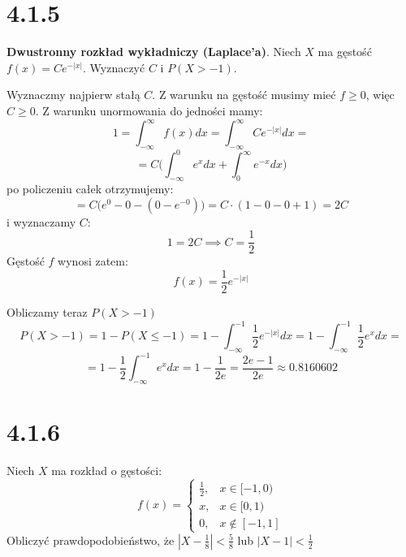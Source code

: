 \documentclass{article}
\begin{document}
\section*{4.1.5}
\begin{center}
    \textbf{Dwustronny rozkład wykładniczy (Laplace'a)}. Niech \(X\) ma gęstość \(f(x) = Ce^{-|x|}\).
    Wyznaczyć \(C\) i \(P(X > -1)\).
\end{center}
Wyznaczmy najpierw stałą \(C\). Z warunku na gęstość musimy mieć \(f \geq 0\), więc \(C \geq 0\). Z warunku unormowania do jedności mamy:
\begin{equation*}
    1 = \int_{-\infty}^{\infty} f(x)dx = \int_{-\infty}^{\infty} Ce^{-|x|} dx = 
\end{equation*}
\begin{equation*}
    = C \Big(\int_{-\infty}^{0} e^{x} dx + \int_{0}^{\infty} e^{-x} dx\Big)
\end{equation*}
po policzeniu całek otrzymujemy:
\begin{equation*}
    = C \Big(e^0 - 0 - (0 - e^{-0})\Big) = C \cdot (1 - 0 - 0 + 1) = 2C
\end{equation*}
i wyznaczamy \(C\):
\begin{equation*}
    1 = 2C \implies C = \frac{1}{2}
\end{equation*}
Gęstość \(f\) wynosi zatem:
\begin{equation*}
    f(x) = \frac{1}{2}e^{-|x|}
\end{equation*}
\par Obliczamy teraz \(P(X > -1)\)
\begin{equation*}
    P(X > -1) = 1 - P(X \leq -1) = 1 - \int_{-\infty}^{-1} \frac{1}{2}e^{-|x|} dx = 1 - \int_{-\infty}^{-1} \frac{1}{2}e^{x} dx = 
\end{equation*}
\begin{equation*}
    = 1 - \frac{1}{2} \int_{-\infty}^{-1} e^{x} dx = 1 - \frac{1}{2e} = \frac{2e - 1}{2e} \approx 0.8160602
\end{equation*}

\section*{4.1.6}
\begin{center}
    Niech \(X\) ma rozkład o gęstości:
    \begin{equation*}
        f(x) = 
            \begin{cases}
                \frac{1}{2},& x \in [-1, 0)\\
                x,& x \in [0, 1)\\
                0,& x \not\in [-1, 1] 
            \end{cases}
    \end{equation*}
    Obliczyć prawdopodobieństwo, że \(|X - \frac{1}{8}| < \frac{5}{8}\) lub \(|X - 1| < \frac{1}{2}\)
\end{center}
\end{document}

